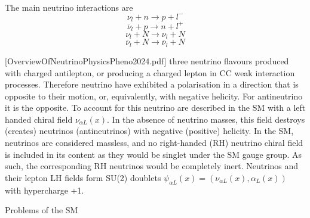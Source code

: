 The main neutrino interactions are
\begin{equation}
\nu_l+n\rightarrow p+l^-
\end{equation}
\begin{equation}
\overline{\nu}_l+p\rightarrow n+l^+
\end{equation}
\begin{equation}
\nu_l+N\rightarrow\nu_l+N
\end{equation}
\begin{equation}
\overline{\nu}_l+N\rightarrow\overline{\nu}_l+N
\end{equation}

[OverviewOfNeutrinoPhysicsPheno2024.pdf]
three neutrino flavours produced with charged antilepton, or producing a charged lepton in CC weak interaction processes. Therefore neutrino have exhibited a polarisation in a direction that is opposite to their motion, or, equivalently, with negative helicity. For antineutrino it is the opposite. To account for this neutrino are described in the SM with a left handed chiral field $\nu_{\alpha L}\left(x\right)$. In the absence of neutrino masses, this field destroys (creates) neutrinos (antineutrinos) with negative (positive) helicity.  In the SM, neutrinos are considered massless, and no right-handed (RH) neutrino chiral field is included in its content as they would be singlet under the SM gauge group. As such, the corresponding RH neutrinos would be completely inert. Neutrinos and their lepton LH fields form SU(2) doublets $\psi_{\alpha L}\left(x\right)=\left(\nu_{\alpha L}\left(x\right),\alpha_L\left(x\right)\right)$ with hypercharge +1.


Problems of the SM

